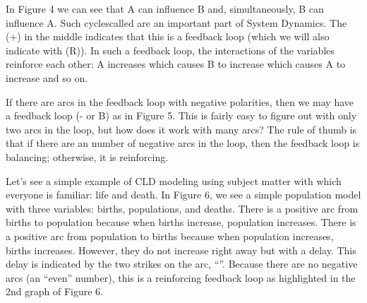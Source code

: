 \documentclass[letterpaper,10pt,english]{sphinxmanual}
\begin{document}
\begin{DUlineblock}{0em}
\item[] 
\end{DUlineblock}

In Figure 4 we can see that A can influence B and, simultaneously, B can influence A. Such cycles\textendash{}called \textendash{}are an important part of System Dynamics. The (+) in the middle indicates that this is a  feedback loop (which we will also indicate with (R)). In such a feedback loop, the interactions of the variables reinforce each other: A increases which causes B to increase which causes A to increase and so on.


\begin{DUlineblock}{0em}
\item[] 
\end{DUlineblock}

If there are arcs in the feedback loop with negative polarities, then we may have a  feedback loop (- or B) as in Figure 5. This is fairly easy to figure out with only two arcs in the loop, but how does it work with many arcs? The rule of thumb is that if there are an  number of negative arcs in the loop, then the feedback loop is balancing; otherwise, it is reinforcing.


\begin{DUlineblock}{0em}
\item[] 
\end{DUlineblock}

Let’s see a simple example of CLD modeling using subject matter with which everyone is familiar: life and death. In Figure 6, we see a simple population model with three variables: births, populations, and deaths. There is a positive arc from births to population because when births increase, population increases. There is a positive arc from population to births because when population increases, births increases. However, they do not increase right away but with a delay. This delay is
indicated by the two strikes on the arc, “\textbar{}\textbar{}”. Because there are no negative arcs (an “even” number), this is a reinforcing feedback loop as highlighted in the 2nd graph of Figure 6.
\end{document}
